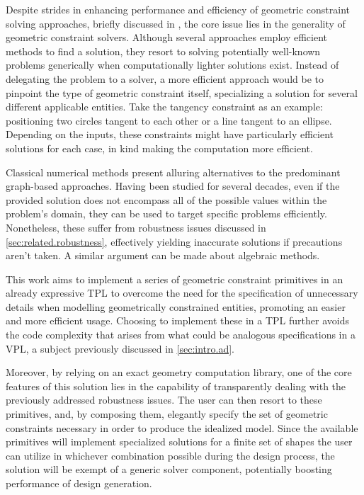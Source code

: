 \cleardoublepage
\label{chap:solution}


Despite strides in enhancing performance and efficiency of geometric constraint
solving approaches, briefly discussed in , the core
issue lies in the generality of geometric constraint solvers. Although several
approaches employ efficient methods to find a solution, they resort to solving
potentially well-known problems generically when computationally lighter
solutions exist. Instead of delegating the problem to a solver, a more efficient
approach would be to pinpoint the type of geometric constraint itself,
specializing a solution for several different applicable entities. Take the
tangency constraint as an example: positioning two circles tangent to each other
or a line tangent to an ellipse. Depending on the inputs, these constraints
might have particularly efficient solutions for each case, in kind making the
computation more efficient.

Classical numerical methods present alluring alternatives to the predominant
graph-based approaches. Having been studied for several decades, even if the
provided solution does not encompass all of the possible values within the
problem's domain, they can be used to target specific problems efficiently.
Nonetheless, these suffer from robustness issues discussed in
\cref{sec:related.robustness}, effectively yielding inaccurate solutions if
precautions aren't taken. A similar argument can be made about algebraic
methods.

This work aims to implement a series of geometric constraint primitives in an
already expressive \ac{TPL} to overcome the need for the specification of
unnecessary details when modelling geometrically constrained entities, promoting
an easier and more efficient usage. Choosing to implement these in a \ac{TPL}
further avoids the code complexity that arises from what could be analogous
specifications in a \ac{VPL}, a subject previously discussed in
\cref{sec:intro.ad}.

Moreover, by relying on an exact geometry computation library, one of the core
features of this solution lies in the capability of transparently dealing with
the previously addressed robustness issues. The user can then resort to these
primitives, and, by composing them, elegantly specify the set of geometric
constraints necessary in order to produce the idealized model. Since the
available primitives will implement specialized solutions for a finite set of
shapes the user can utilize in whichever combination possible during the design
process, the solution will be exempt of a generic solver component, potentially
boosting performance of design generation.

